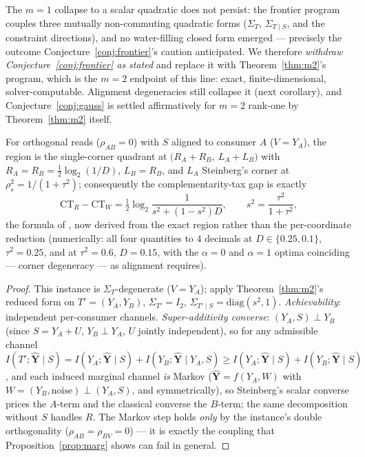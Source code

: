 \documentclass[11pt]{article}
\begin{document}
\begin{remark}\label{rem:noclosed}
The $m=1$ collapse to a scalar quadratic does not persist: the frontier
program couples three mutually non-commuting quadratic forms
($\Sigma_T$, $\Sigma_{T\mid S}$, and the constraint directions), and no
water-filling closed form emerged --- precisely the outcome
Conjecture~\ref{conj:frontier}'s caution anticipated. We therefore
\emph{withdraw Conjecture~\ref{conj:frontier} as stated} and replace it
with Theorem~\ref{thm:m2}'s program, which is the $m=2$ endpoint
of this line: exact, finite-dimensional, solver-computable. Alignment
degeneracies still collapse it (next corollary), and
Conjecture~\ref{conj:gauss} is settled affirmatively for $m=2$ rank-one
by Theorem~\ref{thm:m2} itself.
\end{remark}

\begin{corollary}\label{cor:go10}
For orthogonal reads ($\rho_{AB}=0$) with $S$ aligned to consumer $A$
($V=Y_A$), the region is the single-corner quadrant at
$\bigl(R_A+R_B,\ L_A+L_B\bigr)$ with $R_A=R_B=\tfrac12\log_2(1/D)$,
$L_B=R_B$, and $L_A$ Steinberg's corner at $\rho_s^2=1/(1+\tau^2)$;
consequently the complementarity-tax gap is exactly
\[
\mathrm{CT}_R-\mathrm{CT}_W=\tfrac12\log_2\frac1{s^2+(1-s^2)D},
\qquad s^2=\frac{\tau^2}{1+\tau^2},
\]
the formula of \cite[Sec.~5]{bondtaxnote}, now derived from the exact
region rather than the per-coordinate reduction (numerically: all four
quantities to $4$ decimals at $D\in\{0.25,0.1\}$, $\tau^2=0.25$, and at
$\tau^2=0.6$, $D=0.15$, with the $\alpha=0$ and $\alpha=1$ optima
coinciding --- corner degeneracy --- as alignment requires).
\end{corollary}
\begin{proof}
This instance is $\Sigma_T$-degenerate ($V=Y_A$); apply
Theorem~\ref{thm:m2}'s reduced form on $T'=(Y_A,Y_B)$, $\Sigma_{T'}=I_2$,
$\Sigma_{T'\mid S}=\mathrm{diag}(s^2,1)$. \emph{Achievability}:
independent per-consumer channels. \emph{Super-additivity converse}:
$(Y_A,S)\perp Y_B$ (since $S=Y_A+U$, $Y_B\perp Y_A$, $U$ jointly
independent), so for any admissible channel
$I(T';\hat{\mathbf Y}\mid S)=I(Y_A;\hat{\mathbf Y}\mid S)
+I(Y_B;\hat{\mathbf Y}\mid Y_A,S)\ge
I(Y_A;\hat{\mathbf Y}\mid S)+I(Y_B;\hat{\mathbf Y}\mid S)$, and each
induced marginal channel \emph{is} Markov
($\hat{\mathbf Y}=f(Y_A,W)$ with $W=(Y_B,\text{noise})\perp(Y_A,S)$, and
symmetrically), so Steinberg's scalar converse prices the $A$-term and
the classical converse the $B$-term; the same decomposition without $S$
handles $R$. The Markov step holds \emph{only} by the instance's double
orthogonality ($\rho_{AB}=\rho_{BV}=0$) --- it is exactly the coupling
that Proposition~\ref{prop:marg} shows can fail in general.
\end{proof}
\end{document}
